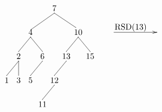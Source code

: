 \documentclass[10pt,a4paper,spanish]{report}
\begin{document}
\begin{minipage}{0.5\textwidth}
\[\begin{xy}
,(32,-8)*+=<20mm>[]\txt<2cm>{RSD(13)}
,(0,0)*+=<10mm>[]\txt<2cm>{7}
,(-10,-10)*+=<10mm>[]\txt<2cm>{4}
,(10,-10)*+=<10mm>[]\txt<2cm>{10}
,(-15,-20)*+=<10mm>[]\txt<2cm>{2}
,(-5,-20)*+=<10mm>[]\txt<2cm>{6}
,(5,-20)*+=<10mm>[]\txt<2cm>{13}
,(15,-20)*+=<10mm>[]\txt<2cm>{15}
,(-20,-30)*+=<10mm>[]\txt<2cm>{1}
,(-15,-30)*+=<10mm>[]\txt<2cm>{3}
,(-10,-30)*+=<10mm>[]\txt<2cm>{5}
,(0,-30)*+=<10mm>[]\txt<2cm>{12}
,(-5,-40)*+=<10mm>[]\txt<2cm>{11}

\ar@{->} (25,-10);(43,-10)
\ar@{-} (0,-2);(-10,-9) %
\ar@{-} (0,-2);(9,-8) %
\ar@{-} (-10,-12);(-15,-18) %
\ar@{-} (10,-12);(5,-18) %
\ar@{-} (10,-12);(15,-18) %
\ar@{-} (-15,-22);(-20,-28)
\ar@{-} (-15,-22);(-15,-28)
\ar@{-} (-10,-12);(-5,-18) %
\ar@{-} (-5,-22);(-10,-28) %
\ar@{-} (5,-22);(0,-28)
\ar@{-} (0,-32);(-5,-38)
\end{xy}\]
\end{minipage}
\end{document}
